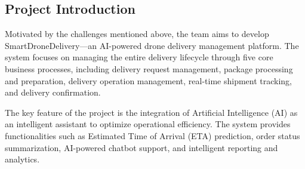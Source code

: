 \subsection{Project Introduction}

Motivated by the challenges mentioned above, the team aims to develop SmartDroneDelivery---an AI-powered drone delivery management platform. The system focuses on managing the entire delivery lifecycle through five core business processes, including delivery request management, package processing and preparation, delivery operation management, real-time shipment tracking, and delivery confirmation.

The key feature of the project is the integration of Artificial Intelligence (AI) as an intelligent assistant to optimize operational efficiency. The system provides functionalities such as Estimated Time of Arrival (ETA) prediction, order status summarization, AI-powered chatbot support, and intelligent reporting and analytics.
